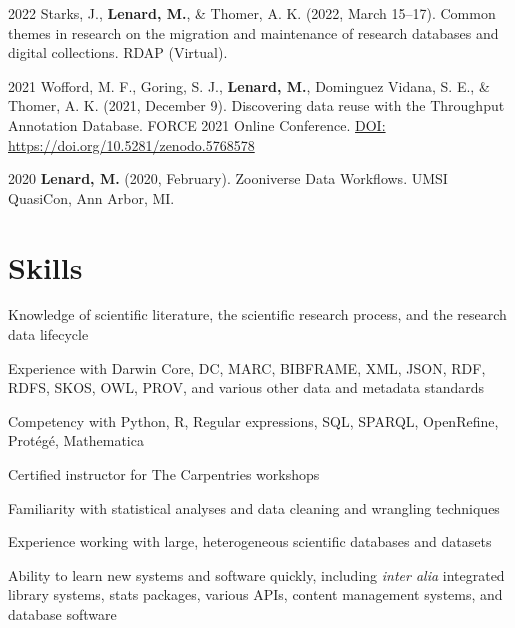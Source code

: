 \documentclass[12pt,letterpaper]{report}
\newcommand{\listitemspace}{0.25em}
\renewenvironment{itemize}
{\begin{list}{}{\setlength{\leftmargin}{0em}
            \setlength{\parskip}{0em}
            \setlength{\itemsep}{\listitemspace}
            \setlength{\parsep}{\listitemspace}}}
{\end{list}}
\begin{document}
\begin{tablist}
    
	\item[2022] \tab Starks, J., \textbf{Lenard, M.}, \& Thomer, A. K. (2022, March 15--17). Common themes in research on the migration and maintenance of research databases and digital collections. RDAP (Virtual).
	
	\item[2021] \tab Wofford, M. F., Goring, S. J., \textbf{Lenard, M.}, Dominguez Vidana, S. E., \& Thomer, A. K. (2021, December 9). Discovering data reuse with the Throughput Annotation Database. FORCE 2021 Online Conference. \href{https://doi.org/10.5281/zenodo.5768578}{DOI: https://doi.org/10.5281/zenodo.5768578}
	
	\item[2020] \tab \textbf{Lenard, M.} (2020, February). Zooniverse Data Workflows. UMSI QuasiCon, Ann Arbor, MI.

\end{tablist}



\section*{Skills}

\begin{itemize}

	\item Knowledge of scientific literature, the scientific research process, and the research data lifecycle
        
	\item Experience with Darwin Core, DC, MARC, BIBFRAME, XML, JSON, RDF, RDFS, SKOS, OWL, PROV, and various other data and metadata standards
        
	\item Competency with Python, R, Regular expressions, SQL, SPARQL, OpenRefine, Protégé, Mathematica
	
	\item Certified instructor for The Carpentries workshops
        
	\item Familiarity with statistical analyses and data cleaning and wrangling techniques

	\item Experience working with large, heterogeneous scientific databases and datasets

	\item Ability to learn new systems and software quickly, including \textit{inter alia} integrated library systems, stats packages, various APIs, content management systems, and database software
        
\end{itemize}
\end{document}
